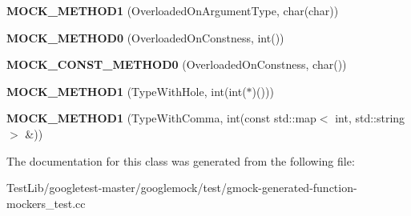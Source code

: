 \begin{DoxyCompactItemize}
{\bfseries M\+O\+C\+K\+\_\+\+M\+E\+T\+H\+O\+D1} (Overloaded\+On\+Argument\+Type, char(char))
\item 
\mbox{\label{classtesting_1_1gmock__generated__function__mockers__test_1_1MockFoo_a291ff46b043d00d0f0acb081c5c36f2e}} 
{\bfseries M\+O\+C\+K\+\_\+\+M\+E\+T\+H\+O\+D0} (Overloaded\+On\+Constness, int())
\item 
\mbox{\label{classtesting_1_1gmock__generated__function__mockers__test_1_1MockFoo_aa0da575ad3061850662c5f401ddb30c2}} 
{\bfseries M\+O\+C\+K\+\_\+\+C\+O\+N\+S\+T\+\_\+\+M\+E\+T\+H\+O\+D0} (Overloaded\+On\+Constness, char())
\item 
\mbox{\label{classtesting_1_1gmock__generated__function__mockers__test_1_1MockFoo_a33077a71c1c5178c25b0a4aa099d5f2c}} 
{\bfseries M\+O\+C\+K\+\_\+\+M\+E\+T\+H\+O\+D1} (Type\+With\+Hole, int(int($\ast$)()))
\item 
\mbox{\label{classtesting_1_1gmock__generated__function__mockers__test_1_1MockFoo_a3774adcc0155dd4c3b5fd790a6f40261}} 
{\bfseries M\+O\+C\+K\+\_\+\+M\+E\+T\+H\+O\+D1} (Type\+With\+Comma, int(const std\+::map$<$ int, std\+::string $>$ \&))
\end{DoxyCompactItemize}


The documentation for this class was generated from the following file\+:\begin{DoxyCompactItemize}
\item 
Test\+Lib/googletest-\/master/googlemock/test/gmock-\/generated-\/function-\/mockers\+\_\+test.\+cc\end{DoxyCompactItemize}
